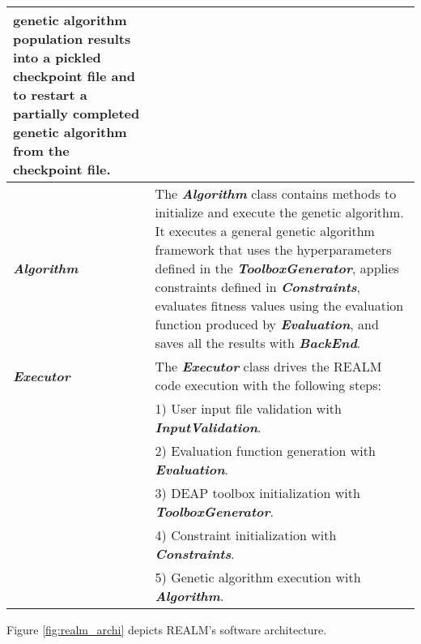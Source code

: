 \begin{table}[]
\begin{tabular}{l|p{}}
    genetic algorithm population results into a pickled checkpoint file and to 
    restart a partially completed genetic algorithm from the checkpoint file. \\
    \hline
    \textbf{\textit{Algorithm}} & The \textbf{\textit{Algorithm}} class contains methods to 
    initialize and execute the genetic algorithm. It executes a general genetic 
    algorithm framework that uses the hyperparameters defined in the 
    \textbf{\textit{ToolboxGenerator}}, applies constraints defined in
    \textbf{\textit{Constraints}}, evaluates fitness values using the evaluation 
    function produced by \textbf{\textit{Evaluation}}, and saves all the results 
    with \textbf{\textit{BackEnd}}. \\
    \hline
    \textbf{\textit{Executor}} & The \textbf{\textit{Executor}} class drives the \gls{REALM} code
    execution with the following steps: \\
    & 1) User input file validation with \textbf{\textit{InputValidation}}. \\
    & 2) Evaluation function generation with \textbf{\textit{Evaluation}}. \\
    & 3) DEAP toolbox initialization with \textbf{\textit{ToolboxGenerator}}. \\ 
    & 4) Constraint initialization with \textbf{\textit{Constraints}}. \\ 
    & 5) Genetic algorithm execution with \textbf{\textit{Algorithm}}. \\
    \hline
    \end{tabular}
    \end{table}
Figure \ref{fig:realm_archi} depicts REALM's software architecture. 

